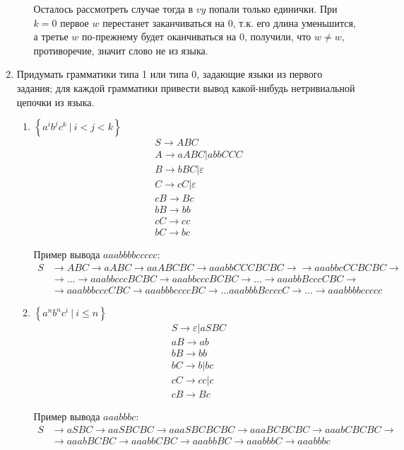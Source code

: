 \documentclass[fleqn]{article}
\begin{document}
\begin{enumerate}
\begin{enumerate}
		Осталось рассмотреть случае тогда в $vy$ попали только единички. При $k = 0$ первое $w$ перестанет 
		заканчиваться на $0$, т.к. его длина уменьшится, а третье $w$ по-прежнему будет оканчиваться на $0$, получили, 
		что $w \neq w$, противоречие, значит слово не из языка.
	\end{enumerate}
	
\item Придумать грамматики типа 1 или типа 0, задающие языки из первого задания; для каждой грамматики привести 
вывод какой-нибудь нетривиальной цепочки из языка.

\begin{enumerate}
	\item $\left\{ a^ib^jc^k   \ | \ i < j < k \right\}$
	\begin{align*}
		& S \to A B C\\
		& A \to a A B C | abbCCC \\
		& B \to b B C | \varepsilon \\
		& C \to cC | \varepsilon \\
		& cB \to Bc \\
		& bB \to bb \\
		& cC \to cc \\
		& bC \to bc 
	\end{align*}
	
	Пример вывода $aaabbbbccccc$:
	\begin{align*}
		S &\to ABC \to aABC \to aaABCBC \to aaabbCCCBCBC \to \to aaabbcCCBCBC \to \\
		&\to \dots \to aaabbcccBCBC \to aaabbcccBCBC \to \dots \to aaabbBcccCBC \to \\
		&\to aaabbbcccCBC \to aaabbbccccBC \to \dots aaabbbBccccC \to \dots \to aaabbbbccccc
	\end{align*}
	
	\item $\left\{ a^nb^nc^i   \ | \ i \leq n \right\}$
	\begin{align*}
	& S \to \varepsilon | aSBC \\
	& aB \to ab \\
	& bB \to bb \\
	& bC \to b|bc \\
	& cC \to cc | c \\
	& cB \to Bc
	\end{align*}
	
	Пример вывода $aaabbbc$:
	\begin{align*}
		S &\to aSBC \to aaSBCBC \to aaaSBCBCBC \to aaaBCBCBC \to aaabCBCBC \to \\
		&\to aaabBCBC \to aaabbCBC \to aaabbBC \to aaabbbC \to aaabbbc
	\end{align*}
	

\end{enumerate}
\end{enumerate}
\end{document}
